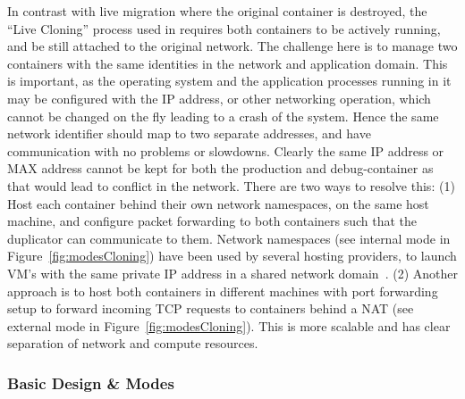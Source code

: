 In contrast with live migration where the original container is destroyed, the ``Live Cloning'' process used in \parikshan requires both containers to be actively running, and be still attached to the original network.
The challenge here is to manage two containers with the same identities in the network and application domain. 
This is important, as the operating system and the application processes running in it may be configured with the IP address, or other networking operation, which cannot be changed on the fly leading to a crash of the system.
Hence the same network identifier should map to two separate addresses, and have communication with no problems or slowdowns.
\iffalse
Clearly the same IP address or MAX address cannot be kept for both the production and debug-container as that would lead to conflict in the network. 
There are two ways to resolve this: 
(1) Host each container behind their own network namespaces, on the same host machine, and configure packet forwarding to both containers such that the duplicator can communicate to them. 
Network namespaces (see internal mode in Figure~\ref{fig:modesCloning}) 
have been used by several hosting providers, to launch VM's with the 
same private IP address in a shared network domain~\cite{OpenStack}. 
(2) Another approach is to host both containers in different machines with port forwarding setup to forward incoming TCP requests to containers behind a NAT (see external mode in Figure~\ref{fig:modesCloning}). 
This is more scalable and has clear separation of network and compute resources. 


\subsubsection{Basic Design \& Modes}

